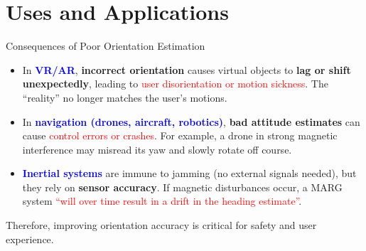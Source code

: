 \documentclass[aspectratio=169,xcolor=dvipsnames]{beamer}
\begin{document}
\section{Uses and Applications}

\begin{frame}{Consequences of Poor Orientation Estimation}
\begin{itemize}
  \item In \textcolor{blue}{\textbf{VR/AR}}, \textbf{incorrect orientation} causes virtual objects to \textbf{lag or shift unexpectedly}, leading to \textcolor{red}{user disorientation or motion sickness}. The “reality” no longer matches the user’s motions.
  \item In \textcolor{blue}{\textbf{navigation (drones, aircraft, robotics)}}, \textbf{bad attitude estimates} can cause \textcolor{red}{control errors or crashes}. For example, a drone in strong magnetic interference may misread its yaw and slowly rotate off course.
  \item \textcolor{blue}{\textbf{Inertial systems}} are immune to jamming (no external signals needed), but they rely on \textbf{sensor accuracy}. If magnetic disturbances occur, a MARG system \textcolor{red}{“will over time result in a drift in the heading estimate”}.
\end{itemize}
Therefore, improving orientation accuracy is critical for safety and user experience.
\end{frame}


\end{document}
